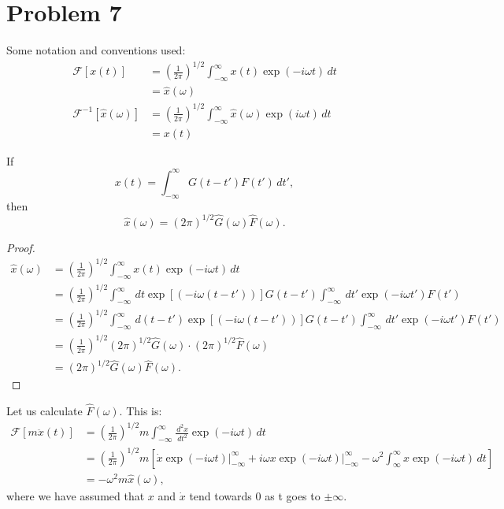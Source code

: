 \documentclass[12pt]{article}
\title{}
\date{}
\author{Jacob H. Nie}
\newcommand{\diff}{\,\textit{d}}
\begin{document}
\section*{Problem 7}

Some notation and conventions used:
\begin{align*}
	\mathcal{F}[x(t)]  &= \left(\frac{1}{2\pi}\right)^{1/2} \int_{-\infty}^{\infty} x(t) \exp(-i\omega t)\diff t \\
		    &= \hat{x}(\omega) \\
	\mathcal{F}^{-1}[\hat{x}(\omega)] &= \left( \frac{1}{2\pi} \right)^{1/2} \int_{-\infty}^{\infty} \hat{x}(\omega) \exp(i\omega t)\diff t \\
					  &= x(t)
\end{align*}

\begin{theorem}
	If \[
		x(t) = \int_{-\infty}^{\infty} G(t-t')F(t') \diff t',
	\] 
	then \[
		\hat{x}(\omega) = (2\pi)^{1/2}\hat{G}(\omega) \hat{F}(\omega).	
	\] 

\end{theorem}

\begin{proof}
	\begin{align*}
		\hat{x}(\omega)  &= \left(\frac{1}{2\pi}\right)^{1/2} \int_{-\infty}^{\infty} x(t) \exp(-i\omega t)\diff t \\
				 &= \left(\frac{1}{2\pi}\right)^{1/2} \int_{-\infty}^{\infty} \diff t \exp\left[\left(-i\omega(t-t')\right)\right] G(t-t') \int_{-\infty}^{\infty} \diff t' \exp(-i\omega t') F(t') \\ 
				 &= \left(\frac{1}{2\pi}\right)^{1/2} \int_{-\infty}^{\infty} \diff (t-t') \exp\left[\left(-i\omega(t-t')\right)\right] G(t-t') \int_{-\infty}^{\infty} \diff t' \exp(-i\omega t') F(t') \\
				 &= \left(\frac{1}{2\pi}\right)^{1/2} (2\pi)^{1/2} \hat{G}(\omega)\cdot (2\pi)^{1/2} \hat{F}(\omega) \\
				 &= (2\pi)^{1/2}\hat{G}(\omega) \hat{F}(\omega).
	\end{align*}
\end{proof}

Let us calculate $\hat{F}(\omega).$  This is:
\begin{align*}
	\mathcal{F}[m\ddot{x}(t)] &= \left(\frac{1}{2\pi}\right)^{1/2} m \int_{-\infty}^{\infty} \frac{\diff^{2}x}{\diff t^{2}} \exp(-i\omega t)\diff t \\
				  &= \left(\frac{1}{2\pi}\right)^{1/2}m\left[\dot{x}\exp(-i\omega t)\Big|_{-\infty}^{\infty} + i\omega x \exp(-i\omega t)\Big|_{-\infty}^{\infty} - \omega^2 \int_{\infty}^{\infty} x \exp(-i\omega t)\diff t \right] \\
				  &= -\omega ^2 m \hat{x}(\omega),
\end{align*}
where we have assumed that $x$ and $\dot{x}$ tend towards 0 as t goes to $\pm \infty$.
\end{document}
